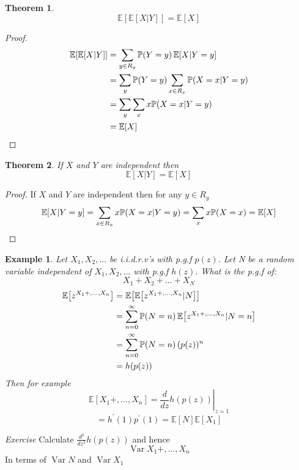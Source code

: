 \documentclass{notes}
\theoremstyle{plain}
\newtheorem{theorem}{Theorem}[chapter]
\newtheorem*{example}{Example}
\newcommand{\bP}{\mathbb{P}}
\newcommand{\bE}{\mathbb{E}}
\newcommand{\prob}[1]{\bP \negthinspace\left(#1\right)}
\newcommand{\expect}[1]{\bE\!\left[#1\right]}
\DeclareMathOperator{\var}{Var}
\begin{document}
\begin{theorem}
\[
\expect{\expect{X|Y}} = \expect{X} 
\]
\end{theorem}
\begin{proof}
\begin{align*}
\expect{\expect{X|Y}} &= \sum_{y\in R_y}\prob{Y=y}\expect{X|Y=y}\\
&=\sum_y\prob{Y=y}\sum_{x\in R_x}\prob{X=x|Y=y}\\
&= \sum_y\sum_x x \prob{X=x|Y=y}\\
&=\expect{X}
\end{align*}
\end{proof}
\begin{theorem}
If $X$ and $Y$ are independent then
\[
\expect{X|Y} = \expect{X}
\]
\end{theorem}
\begin{proof}
If $X$ and $Y$ are independent then for any $y\in R_y$ 
\[
\expect{X|Y=y} = \sum_{x\in R_x}x \prob{X=x|Y=y} = \sum_x x \prob{X=x} = 
\expect{X}
\]
\end{proof}
\begin{example}
Let $X_1,X_2,\dots$ be i.i.d.r.v's with p.g.f $p(z)$.  Let N be a random 
variable independent of $X_1,X_2,\dots$ with p.g.f $h(z)$. What is the p.g.f of:
\[
X_1+X_2+\dots+X_N
\]
\begin{align*}
\expect{z^{X_1+,\dots,X_n}} &= \expect{\expect{z^{X_1+,\dots,X_n}|N}}\\
&= \sum_{n=0}^\infty \prob{N=n}\expect{z^{X_1+,\dots,X_n}|N=n}\\
&=\sum_{n=0}^\infty \prob{N=n}(p(z))^n\\
&=h(p(z))
\end{align*}
Then for example
\[
\expect{X_1+,\dots,X_n} = \left.\frac{d}{dz}h(p(z))\right|_{z=1} 
\]
\[
=h^{'}(1)p^{'}(1) = \expect{N}\expect{X_1}
\]
\end{example}
\emph{Exercise} Calculate $\frac{d^2}{dz^2}h(p(z))$ and hence
\[
\var X_1+,\dots,X_n
\]
In terms of $\var N$ and $\var X_1$
\end{document}

